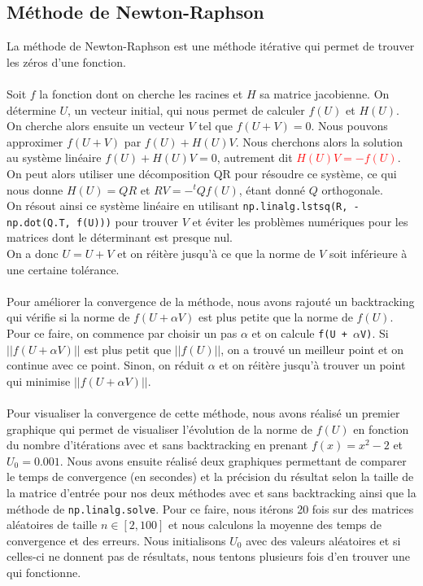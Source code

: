 \documentclass{article}
\begin{document}
\subsection{Méthode de Newton-Raphson}
\label{sec:methodo}
La méthode de Newton-Raphson est une méthode itérative qui permet de trouver les zéros d'une fonction. \\ \\
Soit \(f\) la fonction dont on cherche les racines et \(H\) sa matrice jacobienne. On détermine \(U\), un vecteur initial, qui nous permet de calculer \(f(U)\) et \(H(U)\). \\
On cherche alors ensuite un vecteur \(V\) tel que \(f(U+V) = 0\). Nous pouvons approximer \(f(U+V)\) par \(f(U) + H(U)V\). Nous cherchons alors la solution au système linéaire \(f(U)+H(U)V = 0\), autrement dit \textcolor{red}{\(H(U)V = -f(U)\)}.\\
On peut alors utiliser une décomposition QR pour résoudre ce système, ce qui nous donne \(H(U) = QR\) et \(RV = -{}^{t}Qf(U)\), étant donné \(Q\) orthogonale.\\
On résout ainsi ce système linéaire en utilisant \texttt{np.linalg.lstsq(R, -np.dot(Q.T, f(U)))} pour trouver \(V\) et éviter les problèmes numériques pour les matrices dont le déterminant est presque nul.\\
On a donc \(U = U + V\) et on réitère jusqu'à ce que la norme de \(V\) soit inférieure à une certaine tolérance. \\ \\
Pour améliorer la convergence de la méthode, nous avons rajouté un backtracking qui vérifie si la norme de \(f(U + \alpha V)\) est plus petite que la norme de \(f(U)\).\\
Pour ce faire, on commence par choisir un pas \texttt{$\alpha$} et on calcule \texttt{f(U + $\alpha$V)}.
Si \(||f(U + \alpha V)||\) est plus petit que \(||f(U)||\), on a trouvé un meilleur point et on continue avec ce point.
Sinon, on réduit \(\alpha\) et on réitère jusqu'à trouver un point qui minimise \(||f(U + \alpha V)||\). \\ \\

Pour visualiser la convergence de cette méthode, nous avons réalisé un premier graphique qui permet de visualiser l'évolution de la norme de \(f(U)\) en fonction du nombre d'itérations avec et sans backtracking en prenant \(f(x)=x^2-2\) et \(U_0 = 0.001\). 
Nous avons ensuite réalisé deux graphiques permettant de comparer le temps de convergence (en secondes) et la précision du résultat selon la taille de la matrice d'entrée pour nos deux méthodes avec et sans backtracking ainsi que la méthode de \texttt{np.linalg.solve}. Pour ce faire, nous itérons 20 fois sur des matrices aléatoires de taille \(n \in [2, 100]\) et nous calculons la moyenne des temps de convergence et des erreurs. Nous initialisons \(U_0\) avec des valeurs aléatoires et si celles-ci ne donnent pas de résultats, nous tentons plusieurs fois d'en trouver une qui fonctionne.
\end{document}

